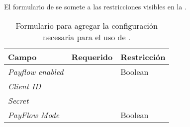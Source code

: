 			El formulario de \paypalNAME se somete a las restricciones visibles en la .

			\begin{table}[H]
			    \centering
				\begin{tabular}{ |l|c||l| }
					\hline Campo & Requerido & Restricción \\ \hline
					\multirow{1}{*}{\textit{Payflow enabled}} 	&  \checkmark 	& Boolean\\ \hline
					\multirow{1}{*}{\textit{Client ID}} 		&  				& \\ \hline
					\multirow{1}{*}{\textit{Secret}} 			&  				& \\ \hline
					\multirow{1}{*}{\textit{PayFlow Mode}} 		&  \checkmark	& Boolean \\ \hline
					\hline
				\end{tabular}
			 	\caption{Formulario para agregar la configuración necesaria para el uso de \paypalPayFlowNAME.}
			    \label{tab:payment:paypal:payflow_pro:form}
			\end{table}
			

